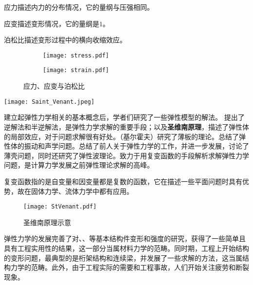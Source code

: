\begin{marginpartext}
        应力描述内力的分布情况，它的量纲与压强相同。

        应变描述变形情况，它的量纲是$1$。

        泊松比描述变形过程中的横向收缩效应。
\end{marginpartext}


\begin{figure}[ht]
    \centering
    \begin{subfigure}[t]{0.8\textwidth} \centering
        \texttt{[image: stress.pdf]}
    \end{subfigure}
    
    \begin{subfigure}[t]{0.8\textwidth} \centering
        \texttt{[image: strain.pdf]}
    \end{subfigure}
    \caption{应力、应变与泊松比}
\end{figure}


\begin{marginparfigure}
    \texttt{[image: Saint\_Venant.jpeg]}
\end{marginparfigure}

建立起弹性力学相关的基本概念后，学者们研究了一些弹性模型的解法。%
提出了逆解法和半逆解法，是弹性力学求解的重要手段；以及\textbf{圣维南原理}，描述了弹性体的局部效应，对于问题求解很有好处。（基尔霍夫）研究了薄板的理论。总结了弹性体的振动和声学问题。总结了前人关于弹性力学的工作，并进一步发展，讨论了薄壳问题，同时还研究了弹性波理论。致力于用复变函数的手段解析求解弹性力学问题，是计算力学发展之前弹性理论求解的高峰。


\begin{marginpartext}
        复变函数指的是自变量和因变量都是复数的函数，它在描述一些平面问题时具有优势，故在固体力学、流体力学中都有应用。
\end{marginpartext}

\begin{figure}[h]
    \centering
    \texttt{[image: StVenant.pdf]}
    \caption{圣维南原理示意}
\end{figure}

弹性力学的发展完善了对、、等基本结构件变形和强度的研究，获得了一些简单且具有工程实用性的结果，这一部分当属材料力学的范畴。同时期，工程上开始结构的变形问题，最典型的是桁架结构和连续梁，并发展了一些求解的方法，这当属结构力学的范畴。此外，由于工程实际的需要和工程事故，人们开始关注疲劳和断裂现象。

